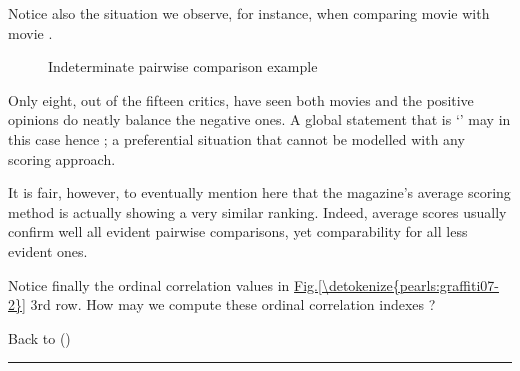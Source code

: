 \documentclass[a4paper,12pt,english]{sphinxhowto}
\let\sphinxpxdimen\pdfpxdimen\else\newdimen\sphinxpxdimen
\begin{document}
\sphinxAtStartPar
Notice also the  situation we observe, for instance, when comparing movie  with movie .

\begin{sphinxVerbatim}[commandchars=\\\{\}]
\end{sphinxVerbatim}

\begin{figure}[H]
\centering
\capstart

\noindent\sphinxincludegraphics[width=400\sphinxpxdimen]{{graffiti07_6}.png}
\caption{Indeterminate pairwise comparison example}\label{\detokenize{pearls:id102}}\end{figure}

\sphinxAtStartPar
Only eight, out of the fifteen critics, have seen both movies and the positive opinions do neatly balance the negative ones. A global statement that  is ‘’   may in this case hence ; a preferential situation that cannot be modelled with any scoring approach.

\sphinxAtStartPar
It is fair, however, to eventually mention here that the  magazine’s average scoring method is actually showing a very similar ranking. Indeed, average scores usually confirm well all evident pairwise comparisons, yet  comparability for all less evident ones.

\sphinxAtStartPar
Notice finally the ordinal correlation  values in
\hyperref[\detokenize{pearls:graffiti07-2}]{Fig.\@ \ref{\detokenize{pearls:graffiti07-2}}} 3rd row. How may we compute these ordinal correlation indexes ?

\sphinxAtStartPar
Back to {\hyperref[\detokenize{pearls:pearls-label}]{}} ()


\bigskip\hrule\bigskip
\end{document}
